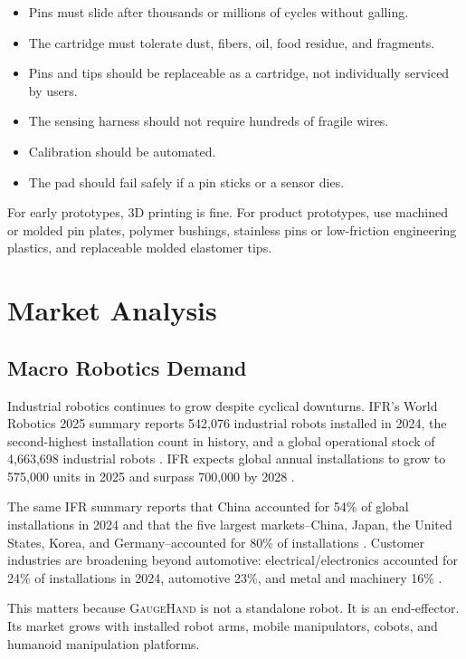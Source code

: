 \documentclass[11pt]{article}
\newcommand{\GaugeHand}{\textsc{GaugeHand}}
\begin{document}
\begin{itemize}[leftmargin=*]
  \item Pins must slide after thousands or millions of cycles without galling.
  \item The cartridge must tolerate dust, fibers, oil, food residue, and fragments.
  \item Pins and tips should be replaceable as a cartridge, not individually serviced by users.
  \item The sensing harness should not require hundreds of fragile wires.
  \item Calibration should be automated.
  \item The pad should fail safely if a pin sticks or a sensor dies.
\end{itemize}

For early prototypes, 3D printing is fine. For product prototypes, use machined or molded pin plates, polymer bushings, stainless pins or low-friction engineering plastics, and replaceable molded elastomer tips.

\section{Market Analysis}

\subsection{Macro Robotics Demand}

Industrial robotics continues to grow despite cyclical downturns. IFR's World Robotics 2025 summary reports 542,076 industrial robots installed in 2024, the second-highest installation count in history, and a global operational stock of 4,663,698 industrial robots \cite{ifr2025industrial}. IFR expects global annual installations to grow to 575,000 units in 2025 and surpass 700,000 by 2028 \cite{ifr2025industrial}.

The same IFR summary reports that China accounted for 54\% of global installations in 2024 and that the five largest markets--China, Japan, the United States, Korea, and Germany--accounted for 80\% of installations \cite{ifr2025industrial}. Customer industries are broadening beyond automotive: electrical/electronics accounted for 24\% of installations in 2024, automotive 23\%, and metal and machinery 16\% \cite{ifr2025industrial}.

This matters because \GaugeHand{} is not a standalone robot. It is an end-effector. Its market grows with installed robot arms, mobile manipulators, cobots, and humanoid manipulation platforms.
\end{document}
